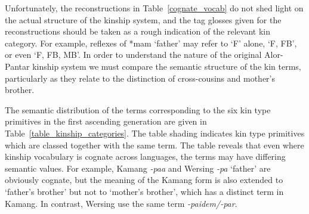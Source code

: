Unfortunately, the reconstructions in Table~\ref{cognate_vocab} do not shed light on the actual structure of the kinship system, and the tag glosses given for the reconstructions should be taken as a rough indication of the relevant kin category. For example, reflexes of *mam `father' may refer to `F' alone, `F, FB', or even `F, FB, MB'. In order to understand the nature of the original Alor-Pantar kinship system we must compare the semantic structure of the kin terms, particularly as they relate to the distinction of cross-cousins and mother's brother.

The semantic distribution of the terms corresponding to the six kin type primitives in the first ascending generation are given in Table~\ref{table_kinship_categories}. The table shading indicates kin type primitives which are classed together with the same term. The table reveals that even where kinship vocabulary is cognate across languages, the terms may have differing semantic values. For example, Kamang \textit{-paa} and Wersing \textit{-pa} `father' are obviously cognate, but the meaning of the Kamang form is also extended to `father's brother' but not to `mother's brother', which has a distinct term in Kamang. In contrast, Wersing use the same term \textit{-paidem/-par}.

 

